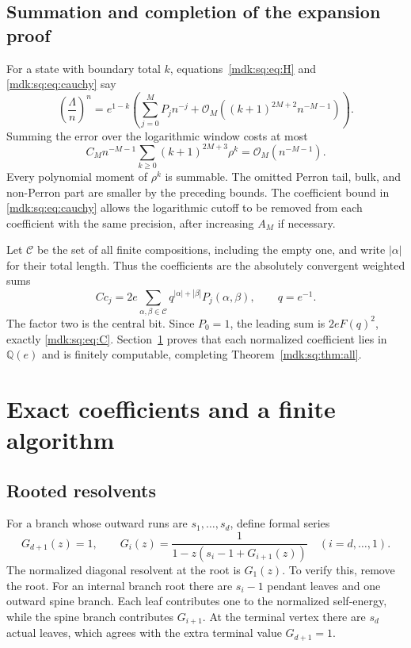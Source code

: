 \documentclass[11pt,letterpaper]{article}
\numberwithin{equation}{section}
\theoremstyle{remark}\newtheorem{remark}[theorem]{Remark}
\newcommand{\Oh}{\mathcal O}\newcommand{\Q}{\mathbb Q}\newcommand{\N}{\mathbb N}\newcommand{\R}{\mathbb R}
\newcommand{\comp}{\mathcal C}
\begin{document}
\subsection{Summation and completion of the expansion proof}
For a state with boundary total $k$, equations~\eqref{mdk:sq:eq:H} and \eqref{mdk:sq:eq:cauchy} say
\[
\left(\frac\Lambda n\right)^n
=e^{1-k}\left(\sum_{j=0}^MP_jn^{-j}
+\Oh_M((k+1)^{2M+2}n^{-M-1})\right).
\]
Summing the error over the logarithmic window costs at most
\[
C_Mn^{-M-1}\sum_{k\ge0}(k+1)^{2M+3}\rho^k
=\Oh_M(n^{-M-1}).
\]
Every polynomial moment of $\rho^k$ is summable. The omitted Perron tail, bulk, and non-Perron part are smaller by the preceding bounds. The coefficient bound in \eqref{mdk:sq:eq:cauchy} allows the logarithmic cutoff to be removed from each coefficient with the same precision, after increasing $A_M$ if necessary.

Let $\comp$ be the set of all finite compositions, including the empty one, and write $|\alpha|$ for their total length. Thus the coefficients are the absolutely convergent weighted sums
\begin{equation}\label{mdk:sq:eq:c-sum}
Cc_j=2e\sum_{\alpha,\beta\in\comp}
q^{|\alpha|+|\beta|}P_j(\alpha,\beta),\qquad q=e^{-1}.
\end{equation}
The factor two is the central bit. Since $P_0=1$, the leading sum is $2eF(q)^2$, exactly \eqref{mdk:sq:eq:C}. Section~\ref{mdk:sq:sec:coeff} proves that each normalized coefficient lies in $\Q(e)$ and is finitely computable, completing Theorem~\ref{mdk:sq:thm:all}.

\section{Exact coefficients and a finite algorithm}\label{mdk:sq:sec:coeff}
\subsection{Rooted resolvents}
For a branch whose outward runs are $s_1,\ldots,s_d$, define formal series
\begin{equation}\label{mdk:sq:eq:G}
G_{d+1}(z)=1,\qquad
G_i(z)=\frac1{1-z(s_i-1+G_{i+1}(z))}\quad(i=d,\ldots,1).
\end{equation}
The normalized diagonal resolvent at the root is $G_1(z)$. To verify this, remove the root. For an internal branch root there are $s_i-1$ pendant leaves and one outward spine branch. Each leaf contributes one to the normalized self-energy, while the spine branch contributes $G_{i+1}$. At the terminal vertex there are $s_d$ actual leaves, which agrees with the extra terminal value $G_{d+1}=1$.
\end{document}
